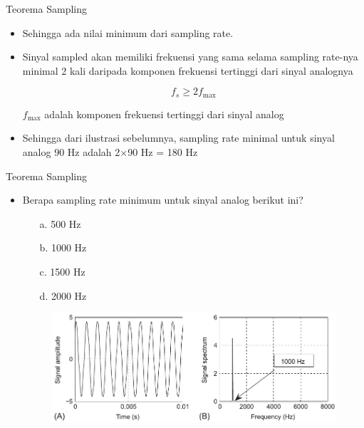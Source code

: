 \documentclass[pdflatex,compress,mathserif]{beamer}
\begin{document}
\begin{frame}{Teorema Sampling}
    \begin{itemize}
        \item Sehingga ada nilai minimum dari sampling rate.
        \item Sinyal sampled akan memiliki frekuensi yang sama selama sampling rate-nya minimal 2 kali daripada komponen frekuensi tertinggi dari sinyal analognya

        \begin{equation}
            f_s \geq 2 f_\text{max}
        \end{equation}

        $f_\text{max}$ adalah komponen frekuensi tertinggi dari sinyal analog
        \item Sehingga dari ilustrasi sebelumnya, sampling rate minimal untuk sinyal analog 90 Hz adalah 2$\times$90 Hz = 180 Hz
    \end{itemize}
\end{frame}

\begin{frame}{Teorema Sampling}
    \begin{itemize}
        \item Berapa sampling rate minimum untuk sinyal analog berikut ini?
        \begin{multicols}{2}
            \begin{enumerate}
                \item[a.] 500 Hz
                \item[b.] 1000 Hz
                \columnbreak
                \item[c.] 1500 Hz
                \item[d.] 2000 Hz
            \end{enumerate}
        \end{multicols}
        \begin{figure}
            \includegraphics[width=\linewidth]{./img/img06}
        \end{figure}
    \end{itemize}
\end{frame}
\end{document}
